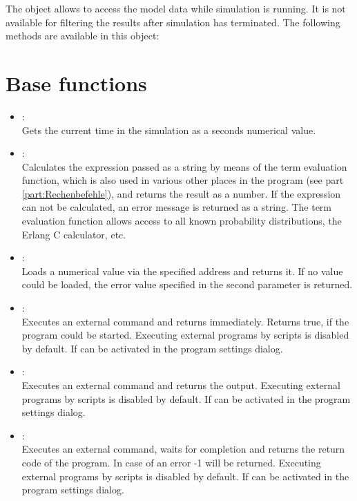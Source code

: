 The  object allows to access the model data while simulation is running.
It is not available for filtering the results after simulation has terminated.
The following methods are available in this object:

\section{Base functions}

\begin{itemize}

\item
{}:\\
Gets the current time in the simulation as a seconds numerical value.

\item
{}:\\
Calculates the expression passed as a string by means of the term evaluation function,
which is also used in various other places in the program (see part \ref{part:Rechenbefehle}),
and returns the result as a number. If the expression can not be calculated, an error message is returned as a string.
The term evaluation function allows access to all known probability distributions,
the Erlang C calculator, etc.

\item
{}:\\
Loads a numerical value via the specified address and returns it.
If no value could be loaded, the error value specified in the second parameter is returned.

\item
{}:\\
Executes an external command and returns immediately. Returns true, if the program could be started.
Executing external programs by scripts is disabled by default. If can be activated
in the program settings dialog.

\item
{}:\\
Executes an external command and returns the output.
Executing external programs by scripts is disabled by default. If can be activated
in the program settings dialog.

\item
{}:\\
Executes an external command, waits for completion and returns the return code of the program.
In case of an error -1 will be returned.
Executing external programs by scripts is disabled by default. If can be activated
in the program settings dialog.


\end{itemize}
